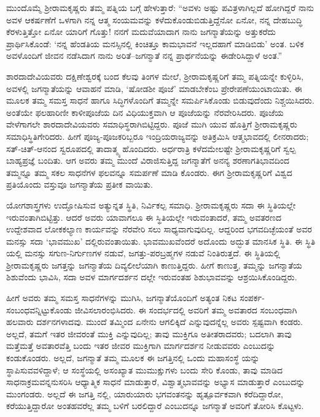 ಮುಂದೊಮ್ಮೆ ಶ್ರೀರಾಮಕೃಷ್ಣರು ತಮ್ಮ ಪತ್ನಿಯ ಬಗ್ಗೆ ಹೇಳುತ್ತಾರೆ: “ಅವಳು ಅಷ್ಟು ಪವಿತ್ರಳಾಗಿಲ್ಲದೆ ಹೋಗಿದ್ದರೆ ನಾನು ಅವಳ ಆಕರ್ಷಣೆಗೆ ಒಳಗಾಗಿ ನನ್ನ ಆತ್ಮ ಸಂಯಮವನ್ನು ಕಳೆದುಕೊಂಡುಬಿಡುತ್ತಿದ್ದೆನೋ ಏನೋ, ನನ್ನ ದೇಹಬುದ್ಧಿ ಕೆರಳುತ್ತಿತ್ತೋ ಏನೋ ಯಾರಿಗೆ ಗೊತ್ತು! ನನಗೆ ಮದುವೆಯಾದಾಗ ನಾನು ಜಗನ್ಮಾತೆಯನ್ನು ಅತ್ತುಕರೆದು ಪ್ರಾರ್ಥಿಸಿಕೊಂಡೆ: ‘ನನ್ನ ಹೆಂಡತಿಯ ಮನಸ್ಸಿನಲ್ಲಿ ಕಿಂಚಿತ್ತೂ ಕಾಮಭಾವನೆ ಇಲ್ಲದಹಾಗೆ ಮಾಡಿಬಿಡು’ ಅಂತ. ಬಳಿಕ ಅವಳೊಂದಿಗೆ ಜೀವನ ನಡೆಸಿದಾಗ ನಾನು ಅರಿತೆ–ಜಗನ್ಮಾತೆ ನನ್ನ ಪ್ರಾರ್ಥನೆಯನ್ನು ಈಡೇರಿಸಿದ್ದಾಳೆ ಅಂತ.”

ಶಾರದಾದೇವಿಯವರು ದಕ್ಷಿಣೇಶ್ವರಕ್ಕೆ ಬಂದ ಕೆಲವು ತಿಂಗಳ ಮೇಲೆ, ಶ್ರೀರಾಮಕೃಷ್ಣರಿಗೆ ತಮ್ಮ ಪತ್ನಿಯನ್ನೇ ಕುಳ್ಳಿರಿಸಿ, ಅವಳಲ್ಲಿ ಜಗನ್ಮಾತೆಯನ್ನು ಆವಾಹನೆ ಮಾಡಿ, ‘ಷೋಡಶೀ ಪೂಜೆ’ ಮಾಡಬೇಕೆಂಬ ಪ್ರೇರೇಪಣೆಯುಂಟಾಯಿತು. ಈ ಮೂಲಕ ತಮ್ಮ ಸಮಸ್ತ ಸಾಧನೆ ಹಾಗೂ ಸಿದ್ಧಿಗಳೊಂದಿಗೆ ತಮ್ಮನ್ನೇ ಸಮರ್ಪಿಸಿಕೊಂಡು ಬಿಡುವುದೆಂದು ನಿಶ್ಚಯಿಸಿದರು. ಅಂತೆಯೇ ಫಲಹಾರಿಣೀ ಕಾಳೀಪೂಜೆಯ ದಿನ ವಿಧಿಯುಕ್ತವಾಗಿ ಆ ಪೂಜೆಯನ್ನು ನೆರವೇರಿಸಿದರು. ಪೂಜೆಯ ವೇಳೆಗಾಗಲೇ ಶಾರದಾದೇವಿಯವರು ಸಮಾಧಿಸ್ಥರಾಗಿಬಿಟ್ಟಿದ್ದರು. ಪೂಜೆ ಮುಗಿ ಯುವ ಹೊತ್ತಿಗೆ ಶ್ರೀರಾಮಕೃಷ್ಣರು ಸಮಾಧಿಸ್ಥಿತಿಗೇರಿದರು. ಹೀಗೆ ಪೂಜ್ಯ-ಪೂಜಕರಿಬ್ಬರೂ ಇಂದ್ರಿಯರಾಜ್ಯವನ್ನು ಅತಿಕ್ರಮಿಸಿ ಆತ್ಮಭಾವದಲ್ಲಿ ಲೀನರಾದರು; ಸತ್-ಚಿತ್-ಆನಂದ ಸ್ವರೂಪದಲ್ಲಿ ತಾದಾತ್ಮ್ಯ ಹೊಂದಿದರು. ಅರ್ಧರಾತ್ರಿ ಕಳೆದಮೇಲಷ್ಟೇ ಶ್ರೀರಾಮಕೃಷ್ಣರಿಗೆ ಸ್ವಲ್ಪ ಬಾಹ್ಯಪ್ರಜ್ಞೆ ಬಂದಿತು. ಆಗ ಅವರು ತಮ್ಮ ಮುಂದೆ ವಿರಾಜಿಸುತ್ತಿದ್ದ ಜಗನ್ಮಾತೆಗೆ ಅನನ್ಯ ಶರಣಾಗತಿಭಾವದಿಂದ ತಮ್ಮನ್ನೂ ತಮ್ಮ ಸಕಲ ಸಾಧನೆಗಳ ಫಲವನ್ನೂ ಸಮರ್ಪಣೆ ಮಾಡಿ ಕೊಂಡರು. ಈಗ ಶ್ರೀರಾಮಕೃಷ್ಣರಿಗೆ ವಿಶ್ವದ ಪ್ರತಿಯೊಂದು ವಸ್ತುವೂ ಜಗನ್ಮಾತೆಯ ಪ್ರತೀಕ ವಾಯಿತು.

ಯೋಗಶಾಸ್ತ್ರಗಳು ಉದ್ಘೋಷಿಸುವ ಅತ್ಯುನ್ನತ ಸ್ಥಿತಿ, ನಿರ್ವಿಕಲ್ಪ ಸಮಾಧಿ. ಶ್ರೀರಾಮಕೃಷ್ಣರು ಸದಾ ಈ ಸ್ಥಿತಿಯಲ್ಲೇ ಇರುವಂತಾಗಿಬಿಟ್ಟಿತ್ತು. ಆದರೆ ಅವರು ಯಾವಾಗಲೂ ಈ ಸ್ಥಿತಿಯಲ್ಲೇ ಇರುವಂತಾದರೆ, ತಮ್ಮ ಅವತರಣದ ಉದ್ದೇಶವಾದ ಲೋಕಕಲ್ಯಾಣ ಕಾರ್ಯವನ್ನು ನೆರವೇರಿ ಸಲು ಸಾಧ್ಯವಾಗುವುದಿಲ್ಲ. ಆದ್ದರಿಂದ ಭಗವದಿಚ್ಛೆಯಂತೆ ಅವರ ಮನಸ್ಸು ಸದಾ ‘ಭಾವಮುಖ’ ದಲ್ಲಿರುವಂತಾಯಿತು. ಭಾವಮುಖವೆಂದರೆ ಅದೊಂದು ಅದ್ಭುತ ಮಾನಸಿಕ ಸ್ಥಿತಿ. ಈ ಸ್ಥಿತಿ ಯಲ್ಲಿ ಮನಸ್ಸು ಸಗುಣ-ನಿರ್ಗುಣಗಳ ನಡುವೆ, ಜಗತ್ತು-ಪರಬ್ರಹ್ಮಗಳ ನಡುವೆ ನಿಂತಿರುತ್ತದೆ. ಈ ಸ್ಥಿತಿಯಲ್ಲಿ ಶ್ರೀರಾಮಕೃಷ್ಣರು ಜಗತ್ತನ್ನು ಜಗನ್ಮಾತೆಯ ದಿವ್ಯಲೀಲೆಯಾಗಿ ಕಾಣುತ್ತಿದ್ದರು. ಹೀಗೆ ಕಾಣುತ್ತ, ತಮ್ಮನ್ನು ಜಗನ್ಮಾತೆಯ ಶಿಶುವೆಂದು ಭಾವಿಸಿ, ಸದಾ ಅವಳ ಮಾರ್ಗದರ್ಶನ ದಲ್ಲೇ ಇರುವಂತಹ ಶಿಶುಭಾವವನ್ನು ಆಶ್ರಯಿಸಿಕೊಂಡಿದ್ದರು.

ಹೀಗೆ ಅವರು ತಮ್ಮ ಸಮಸ್ತ ಸಾಧನೆಗಳನ್ನು ಮುಗಿಸಿ, ಜಗನ್ಮಾತೆಯೊಂದಿಗೆ ಅತ್ಯಂತ ನಿಕಟ ಸಂಪರ್ಕ-ಸಂಬಂಧವನ್ನಿಟ್ಟುಕೊಂಡು ಜೀವಿಸಲಾರಂಭಿಸಿದರು. ಈ ಸಂದರ್ಭದಲ್ಲಿ ಅವರಿಗೆ ತಮ್ಮ ಅವತಾರದ ಸಂಬಂಧವಾಗಿ ಹಲವಾರು ದರ್ಶನಗಳಾದವು. ಮುಂದೆ ತಮ್ಮಿಂದ ಏನೇನು ಆಗಲಿಕ್ಕಿದೆ ಎನ್ನುವುದನ್ನೆಲ್ಲ ಅವರು ಸ್ಪಷ್ಟವಾಗಿ ಕಂಡರು. ಅಲ್ಲದೆ, ತಮಗೆ ಇತರ ಜೀವರಂತೆ ಮುಕ್ತಿ ಎನ್ನುವುದಿಲ್ಲ; ತಾವು ಮುಕ್ತಿಗೂ ಅತೀತರಾದವರು; ಬದಲಾಗಿ ತಾವು ಮತ್ತೆಮತ್ತೆ ಅವತಾರವೆತ್ತಿ ಬಂದು ಇತರ ಜೀವರ ಮುಕ್ತಿಗಾಗಿ ಮಾರ್ಗದರ್ಶನ ನೀಡುವವರು ಎಂಬುದನ್ನು ಕಂಡುಕೊಂಡರು. ಅಲ್ಲದೆ, ಜಗನ್ಮಾತೆ ತಮ್ಮ ಮೂಲಕ ಈ ಜಗತ್ತಿನಲ್ಲಿ ಒಂದು ಮಹಾಸಂಸ್ಥೆ ಯನ್ನು ಸ್ಥಾಪಿಸುವವಳಿದ್ದಾಳೆ; ಆ ಸಂಸ್ಥೆಯಲ್ಲಿ ಅಸಂಖ್ಯಾತ ಮುಮುಕ್ಷುಗಳು ಬಂದು ಸೇರಿ ಕೊಂಡು, ತಾವು ಮಾಡಿದ ಸಾಧನಾಕ್ರಮವನ್ನನುಸರಿಸಿ ಆಧ್ಯಾತ್ಮಿಕ ಸಾಧನೆ ಮಾಡುತ್ತಾರೆ, ವಿಶ್ವಾತ್ಮಭಾವವನ್ನು ಅಭ್ಯಾಸ ಮಾಡುತ್ತಾರೆ ಎಂಬುದನ್ನು ಮುಂಗಂಡರು. ಅಲ್ಲದೆ ಈ ಜಗತ್ತಿ ನಲ್ಲಿ, ಯಾರುಯಾರು ಭಗವಂತನನ್ನು ಹೃತ್ಪೂರ್ವಕವಾಗಿ ಕರೆದಿದ್ದಾರೋ, ಕರೆಯುತ್ತಿದ್ದಾರೋ ಅಂತಹವರೆಲ್ಲ ತಮ್ಮ ಬಳಿಗೆ ಬರಲಿದ್ದಾರೆ ಎಂಬುದನ್ನೂ ಜಗನ್ಮಾತೆ ಅವರಿಗೆ ತೋರಿಸಿ ಕೊಟ್ಟಳು.

